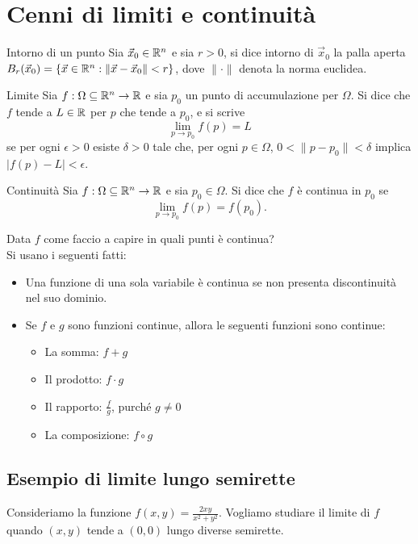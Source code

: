 \section{Cenni di limiti e continuità}

\begin{definizione}{Intorno di un punto}
Sia $\vec x_0 \in \mathbb{R}^n$ e sia $r>0$, si dice intorno di $\vec x_0$ la palla aperta $B_r(\vec x_0)=\{\vec x \in \mathbb{R}^n : \|\vec x - \vec x_0\|<r\}$, dove $\|\cdot\|$ denota la norma euclidea.\\
\end{definizione}

\begin{definizione}{Limite}
Sia $f:\Omega \subseteq \mathbb{R}^n \rightarrow \mathbb{R}$ e sia $p_0$ un punto di accumulazione per $\Omega$. Si dice che $f$ tende a $L \in \mathbb{R}$ per $p$ che tende a $p_0$, e si scrive
$$\lim_{p \to p_0} f(p) = L$$
se per ogni $\epsilon > 0$ esiste $\delta > 0$ tale che, per ogni $p \in \Omega$, $0 < \|p - p_0\| < \delta$ implica $|f(p) - L| < \epsilon$.
\end{definizione}

\begin{definizione}{Continuità}
Sia $f:\Omega \subseteq \mathbb{R}^n \rightarrow \mathbb{R}$ e sia $p_0 \in \Omega$. Si dice che $f$ è continua in $p_0$ se
$$\lim_{p \to p_0} f(p) = f(p_0).$$
\end{definizione}

Data $f$ come faccio a capire in quali punti è continua?\\
Si usano i seguenti fatti:
\begin{itemize}
  \item Una funzione di una sola variabile è continua se non presenta discontinuità nel suo dominio.
  \item Se $f$ e $g$ sono funzioni continue, allora le seguenti funzioni sono continue:
  \begin{itemize}
    \item La somma: $f + g$
    \item Il prodotto: $f \cdot g$
    \item Il rapporto: $\frac{f}{g}$, purché $g \neq 0$
    \item La composizione: $f \circ g$
  \end{itemize}
\end{itemize}

\subsection{Esempio di limite lungo semirette}
Consideriamo la funzione $f(x,y)= \frac{2xy}{x^2+y^2}$. Vogliamo studiare il limite di $f$ quando $(x,y)$ tende a $(0,0)$ lungo diverse semirette.

